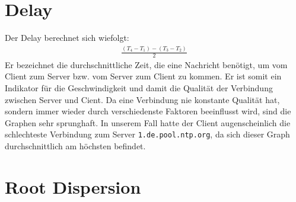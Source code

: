 \documentclass[a4paper,12pt]{scrartcl}
\begin{document}
\section{Delay}



\begin{center}
\end{center}
Der Delay berechnet sich wiefolgt:
\begin{align*}
\frac{(T_4 - T_1) - (T_3 -T_2)}{2}
\end{align*}
Er bezeichnet die durchschnittliche Zeit, die eine Nachricht benötigt, um vom Client zum Server bzw. vom Server zum Client zu kommen. Er ist somit ein Indikator für die Geschwindigkeit und damit die Qualität der Verbindung zwischen Server und Cient. Da eine Verbindung nie konstante Qualität hat, sondern immer wieder durch verschiedenste Faktoren beeinflusst wird, sind die Graphen sehr sprunghaft. In unserem Fall hatte der Client augenscheinlich die schlechteste Verbindung zum Server \texttt{1.de.pool.ntp.org}, da sich dieser Graph durchschnittlich am höchsten befindet.

\section*{Root Dispersion}
\end{document}
